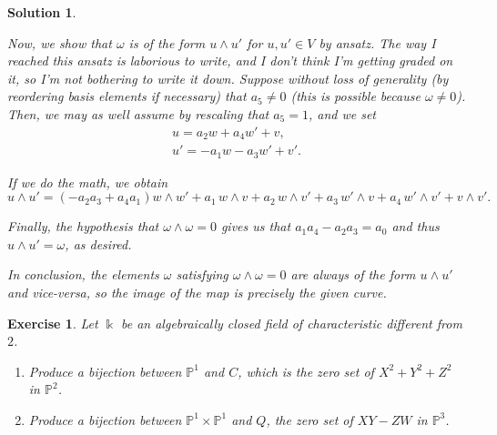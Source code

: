 \documentclass{article}
\newtheorem{ex}{Exercise}
\theoremstyle{nonumberplain}
\newtheorem{sol}{Solution}
\newcommand{\kk}{\Bbbk}
\newcommand{\PP}{\mathbb{P}}
\begin{document}
\begin{sol}
\begin{enumerate}
Now, we show that $\omega$ is of the form $u \wedge u'$ for $u, u' \in V$ by \textit{ansatz}. The way I reached this \textit{ansatz} is laborious to write, and I don't think I'm getting graded on it, so I'm not bothering to write it down. Suppose without loss of generality (by reordering basis elements if necessary) that $a_5 \neq 0$ (this is possible because $\omega \neq 0$). Then, we may as well assume by rescaling that $a_5 = 1$, and we set
\begin{equation}
\begin{gathered}
u = a_2 w + a_4 w' + v,\\
u' = -a_1 w - a_3 w' + v'.
\end{gathered}
\end{equation}

If we do the math, we obtain
\begin{equation}
u \wedge u' = (- a_2 a_3 + a_4 a_1) w \wedge w' + a_1\,w \wedge v + a_2\,w \wedge v' + a_3\, w' \wedge v + a_4\, w' \wedge v' + v \wedge v'.
\end{equation}

Finally, the hypothesis that $\omega \wedge \omega = 0$ gives us that $a_1 a_4 - a_2 a_3 = a_0$ and thus $u \wedge u' = \omega$, as desired.

In conclusion, the elements $\omega$ satisfying $\omega \wedge \omega = 0$ are always of the form $u \wedge u'$ and vice-versa, so the image of the map is precisely the given curve.
\end{enumerate}
\end{sol}

\begin{ex}
Let $\kk$ be an algebraically closed field of characteristic different from $2$.
\begin{enumerate}
\item Produce a bijection between $\PP^1$ and $C$, which is the zero set of $X^2 + Y^2 + Z^2$ in $\PP^2$.
\item Produce a bijection between $\PP^1 \times \PP^1$ and $Q$, the zero set of $XY - ZW$ in $\PP^3$.
\end{enumerate}
\end{ex}
\end{document}
